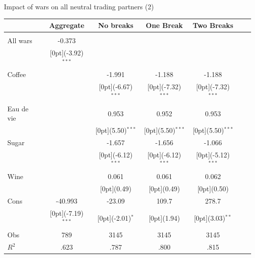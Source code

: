 \documentclass[11pt]{beamer}
\begin{document}
\begin{frame}{Impact of wars on all neutral trading partners (2)}
\begin{tabular*}{\textwidth}{@{\extracolsep{\fill}}lcccccc}						
	& \multicolumn{1}{c}{Aggregate} &	\multicolumn{1}{c}{No breaks} &	\multicolumn{1}{c}{One Break} & \multicolumn{1}{c}{Two Breaks} & \\
\hline					
\hline \\		
All wars &	-0.373 &	 & & & & \\
&	\raisebox{.7ex}[0pt]{\scriptsize (-3.92)$^{***}$} 	& &	& &	& \\				
Coffee &	 & -1.991 & -1.188 &	-1.188  &\\
& &	\raisebox{.7ex}[0pt]{\scriptsize (-6.67)$^{***}$} &	\raisebox{.7ex}[0pt]{\scriptsize (-7.32)$^{***}$} &	\raisebox{.7ex}[0pt]{\scriptsize (-7.32)$^{***}$} &\\
Eau de vie  & &	0.953 &0.952 &	0.953  &\\
& &	\raisebox{.7ex}[0pt]{\scriptsize (5.50)$^{***}$} &	\raisebox{.7ex}[0pt]{\scriptsize (5.50)$^{***}$} &	\raisebox{.7ex}[0pt]{\scriptsize (5.50)$^{***}$} \\
Sugar	& &	-1.657 &-1.656 &	-1.066  \\
& &	\raisebox{.7ex}[0pt]{\scriptsize (-6.12)$^{***}$} &	\raisebox{.7ex}[0pt]{\scriptsize (-6.12)$^{***}$} &	\raisebox{.7ex}[0pt]{\scriptsize (-5.12)$^{***}$} \\
Wine&	 &	0.061 & 0.061 &	0.062 \\
& &	\raisebox{.7ex}[0pt]{\scriptsize (0.49)} &	\raisebox{.7ex}[0pt]{\scriptsize (0.49)} &	\raisebox{.7ex}[0pt]{\scriptsize (0.50)} \\
Cons &	-40.993 &	-23.09 &	109.7  &	278.7 \\
&	\raisebox{.7ex}[0pt]{\scriptsize (-7.19)$^{***}$} &	\raisebox{.7ex}[0pt]{\scriptsize (-2.01)$^{*}$} &	\raisebox{.7ex}[0pt]{\scriptsize (1.94)} &	\raisebox{.7ex}[0pt]{\scriptsize (3.03)$^{**}$} \\
\hline 
Obs &	789 &	3145 &	3145  & 3145 \\
$ R^2$ &	.623 &	.787 &	.800  & .815 \\

\hline\hline						
\end{tabular*}%
\end{frame}
\end{document}
